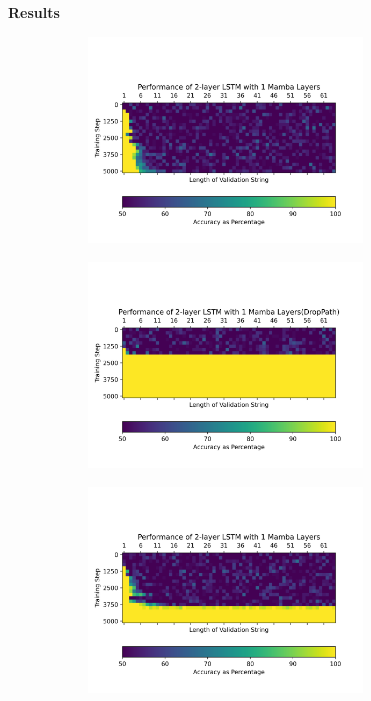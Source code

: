 \textbf{Results}
\begin{figure}
    \begin{subfigure}{0.5\textwidth}
        \begin{center}
        \includegraphics[width=0.8\textwidth]{figures/parity_lstm_False_3_1.png}
        \end{center}
    \end{subfigure}\begin{subfigure}{0.5\textwidth}
        \begin{center}
        \includegraphics[width=0.8\textwidth]{figures/parity_lstm_True_3_1.png}
        \end{center}
    \end{subfigure}
    \begin{subfigure}{0.5\textwidth}
        \begin{center}
        \includegraphics[width=0.8\textwidth]{figures/parity_lstm_False_3_2.png}

\end{center}
\end{subfigure}
\end{figure}
